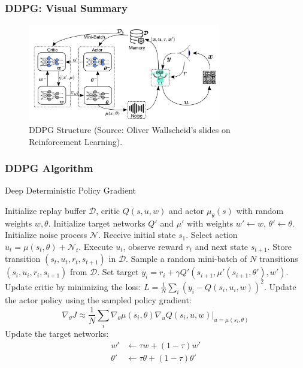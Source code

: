 \documentclass[9pt, aspectratio=169]{beamer}
\begin{document}
\begin{frame}
  \frametitle{DDPG: Visual Summary}
    \begin{figure}
    \centering
    \includegraphics[width=0.75\textwidth]{ddpg.png}
    \caption{DDPG Structure (Source: Oliver Wallscheid's slides on Reinforcement Learning).}
    \end{figure}
\end{frame}

\begin{frame}
  \frametitle{DDPG Algorithm}
    \begin{algorithm}[H]
    \captionsetup{font=scriptsize}
    \caption{Deep Deterministic Policy Gradient}
    \begin{algorithmic}[1]
    \scriptsize
    \STATE Initialize replay buffer $\mathcal{D}$, critic $Q(s, u, w)$ and actor $\mu_\theta(s)$ with random weights $w, \theta$.
    \STATE Initialize target networks $Q'$ and $\mu'$ with weights $w' \leftarrow w$, $\theta' \leftarrow \theta$.
        \STATE Initialize noise process $\mathcal{N}$. Receive initial state $s_1$.
            \STATE Select action $u_t = \mu(s_t, \theta) + \mathcal{N}_t$.
            \STATE Execute $u_t$, observe reward $r_t$ and next state $s_{t+1}$.
            \STATE Store transition $(s_t, u_t, r_t, s_{t+1})$ in $\mathcal{D}$.
            \STATE Sample a random mini-batch of $N$ transitions $(s_i, u_i, r_{i}, s_{i+1})$ from $\mathcal{D}$.
            \STATE Set target $y_i = r_i + \gamma Q'(s_{i+1}, \mu'(s_{i+1}, \theta'), w')$.
            \STATE Update critic by minimizing the loss: $L = \frac{1}{N} \sum_i (y_i - Q(s_i, u_i, w))^2$.
            \STATE Update the actor policy using the sampled policy gradient:
            \[ \nabla_\theta J \approx \frac{1}{N} \sum_i \nabla_\theta \mu(s_i, \theta) \nabla_u Q(s_i, u, w)|_{u=\mu(s_i, \theta)} \]
            \STATE Update the target networks:
            \begin{align*}
                w' &\leftarrow \tau w + (1-\tau) w' \\
                \theta' &\leftarrow \tau \theta + (1-\tau) \theta'
            \end{align*}
        \ENDFOR
    \ENDFOR
    \end{algorithmic}
    \end{algorithm}
\end{frame}
\end{document}
